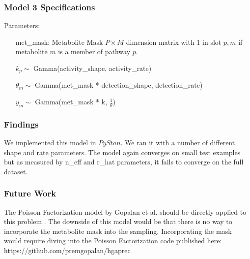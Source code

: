 \documentclass[11pt]{article}
\begin{document}
\subsubsection{Model 3 Specifications}

Parameters:
\begin{itemize}
\item[met\_mask:] Metabolite Mask $ P \times M$ dimension matrix with 1 in slot $p,m$ if metabolite $m$ is a member of pathway $p$.
\item[$k_p \sim$] Gamma(activity\_shape, activity\_rate)
\item[$\theta_m \sim$] Gamma(met\_mask * detection\_shape, detection\_rate)
\item[$y_m \sim$] Gamma(met\_mask * k, $\frac{1}{\theta}$)
\end{itemize}

\subsubsection{Findings}

We implemented this model in $PyStan$. We ran it with a number of different shape and rate parameters. The model again converges on small test examples but as measured by n\_eff and r\_hat parameters, it fails to converge on the full dataset.

\subsubsection{Future Work}

The Poisson Factorization model by Gopalan et al. should be directly applied to this problem \cite{Poisson13}. The downside of this model would be that there is no way to incorporate the metabolite mask into the sampling. Incorporating the mask would require diving into the Poisson Factorization code published here: https://github.com/premgopalan/hgaprec
\end{document}
